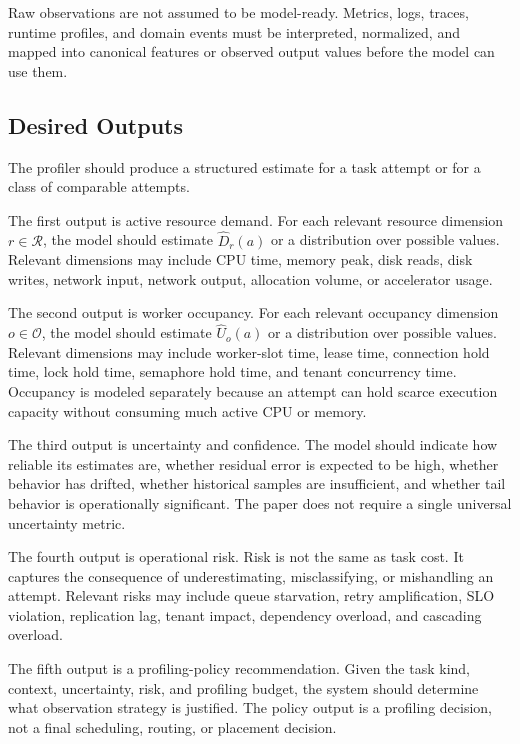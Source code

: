 Raw observations are not assumed to be model-ready. Metrics, logs, traces,
runtime profiles, and domain events must be interpreted, normalized, and mapped
into canonical features or observed output values before the model can use them.

\subsection{Desired Outputs}
\label{sec:problem-desired-outputs}

The profiler should produce a structured estimate for a task attempt or for a
class of comparable attempts.

The first output is active resource demand. For each relevant resource dimension
$r \in \mathcal{R}$, the model should estimate $\widehat{D}_r(a)$ or a
distribution over possible values. Relevant dimensions may include CPU time,
memory peak, disk reads, disk writes, network input, network output, allocation
volume, or accelerator usage.

The second output is worker occupancy. For each relevant occupancy dimension
$o \in \mathcal{O}$, the model should estimate $\widehat{U}_o(a)$ or a
distribution over possible values. Relevant dimensions may include worker-slot
time, lease time, connection hold time, lock hold time, semaphore hold time, and
tenant concurrency time. Occupancy is modeled separately because an attempt can
hold scarce execution capacity without consuming much active CPU or memory.

The third output is uncertainty and confidence. The model should indicate how
reliable its estimates are, whether residual error is expected to be high,
whether behavior has drifted, whether historical samples are insufficient, and
whether tail behavior is operationally significant. The paper does not require a
single universal uncertainty metric.

The fourth output is operational risk. Risk is not the same as task cost. It
captures the consequence of underestimating, misclassifying, or mishandling an
attempt. Relevant risks may include queue starvation, retry amplification, SLO
violation, replication lag, tenant impact, dependency overload, and cascading
overload.

The fifth output is a profiling-policy recommendation. Given the task kind,
context, uncertainty, risk, and profiling budget, the system should determine
what observation strategy is justified. The policy output is a profiling
decision, not a final scheduling, routing, or placement decision.

